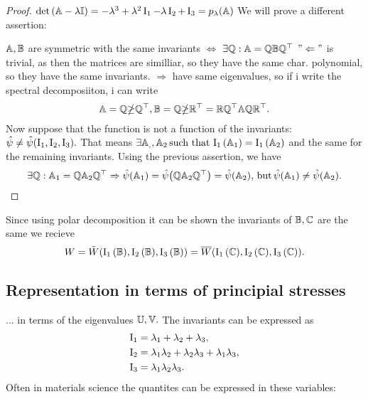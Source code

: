 \documentclass[11pt]{scrartcl} %
\begin{document}
\begin{proof}
    $\det\qty(\mathbb{A}-\lambda \mathbb{I}) = -\lambda^{3} + \lambda^{2} \operatorname{I_1} - \lambda \operatorname{I_2} + \operatorname{I_3} = p_{\lambda}\qty(\mathbb{A})$
    We will prove a different assertion:

    $\mathbb{A}, \mathbb{B}$ are symmetric with the same invariants $\Leftrightarrow$  $\exists \mathbb{Q}: \mathbb{A} = \mathbb{Q} \mathbb{B} \mathbb{Q}^\top$ 
    $"\Leftarrow"$ is trivial, as then the matrices are similliar, so they have the same char. polynomial, so they have the same invariants.
    $\Rightarrow$ have same eigenvalues, so if i write the spectral decomposiiton, i can write
    \[
	    \mathbb{A} = \mathbb{Q} \mathbb{\Lambda} \mathbb{Q}^\top, \mathbb{B} = \mathbb{Q} \mathbb{\Lambda}\mathbb{R}^\top = \mathbb{R}\mathbb{Q}^\top \mathbb{A} \mathbb{Q}\mathbb{R}^\top.
    \]
    Now suppose that the function is not a function of the invariants: $\hat{\psi} \neq \tilde{\psi}\qty(\operatorname{I_1},\operatorname{I_2},\operatorname{I_3}).$ That means $\exists \mathbb{A}_,, \mathbb{A}_2 \, \text{such that} \, \operatorname{I_1}\qty(\mathbb{A}_1) = \operatorname{I_1}\qty(\mathbb{A}_2)$ and the same for the remaining invariants. Using the previous assertion, we have
    \[
	    \exists \mathbb{Q}: \mathbb{A}_1 = \mathbb{Q}\mathbb{A}_2 \mathbb{Q}^\top \Rightarrow \hat{\psi}\qty(\mathbb{A}_1) = \hat{\psi}\qty(\mathbb{Q}\mathbb{A}_2 \mathbb{Q}^\top) = \hat{\psi}\qty(\mathbb{A}_2), \, \text{but} \, \hat{\psi}\qty(\mathbb{A}_1) \neq \hat{\psi}\qty(\mathbb{A}_2).
    \]
\end{proof}
Since using polar decomposition it can be shown the invariants of $\mathbb{B}, \mathbb{C}$ are the same we recieve
\[
	W = \tilde{W}(\operatorname{I_1}\qty(\mathbb{B}), \operatorname{I_2}\qty(\mathbb{B}), \operatorname{I_3}\qty(\mathbb{B})) = \overline{W}\qty(\operatorname{I_1}\qty(\mathbb{C}), \operatorname{I_2}\qty(\mathbb{C}), \operatorname{I_3}\qty(\mathbb{C})).
\]

\subsection{Representation in terms of principial stresses}
\label{sec:representation_principial}
... in terms of the eigenvalues $\mathbb{U},\mathbb{V}.$ The invariants can be expressed as
\begin{align*}
	\operatorname{I_1} &= \lambda_1+\lambda_2 + \lambda_3, \\
	\operatorname{I_2} &= \lambda_1 \lambda_2 + \lambda_2 \lambda_3 + \lambda_1 \lambda_3,\\
	\operatorname{I_3} &= \lambda_1 \lambda_2 \lambda_3.
\end{align*}
Often in materials science the quantites can be expressed in these variables:
\end{document}
